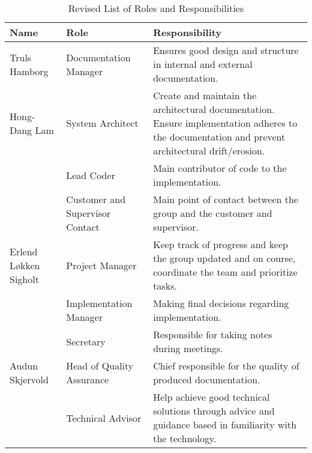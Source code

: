 \begin{table}[H]
\begin{tabular}{|l|l|p{5cm}|}
\hline
\textbf{Name} & \textbf{Role} & \textbf{Responsibility}\\
\hline
Truls Hamborg & Documentation Manager & Ensures good design and structure in internal and external documentation.\\
\hline
Hong-Dang Lam & System Architect & Create and maintain the architectural documentation. Ensure implementation adheres to the documentation and prevent architectural drift/erosion.\\
 & Lead Coder & Main contributor of code to the implementation.\\
 & Customer and Supervisor Contact & Main point of contact between the group and the customer and supervisor.\\
\hline
Erlend Løkken Sigholt & Project Manager & Keep track of progress and keep the group updated and on course, coordinate the team and prioritize tasks.\\
 & Implementation Manager & Making final decisions regarding implementation.\\
 & Secretary & Responsible for taking notes during meetings.\\
\hline
Audun Skjervold & Head of Quality Assurance & Chief responsible for the quality of produced documentation.\\
 & Technical Advisor & Help achieve good technical solutions through advice and guidance based in familiarity with the technology.\\
\hline
\end{tabular}
\caption{Revised List of Roles and Responsibilities}
\end{table}